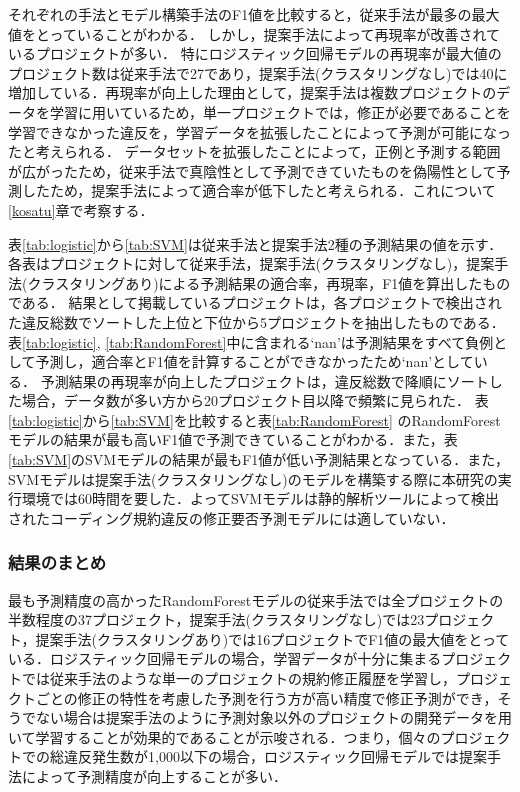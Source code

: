 \documentclass[submit,noauthor,dvipdfmx]{ipsj}
\begin{document}
それぞれの手法とモデル構築手法のF1値を比較すると，従来手法が最多の最大値をとっていることがわかる．
しかし，提案手法によって再現率が改善されているプロジェクトが多い．
特にロジスティック回帰モデルの再現率が最大値のプロジェクト数は従来手法で27であり，提案手法(クラスタリングなし)では40に増加している．再現率が向上した理由として，提案手法は複数プロジェクトのデータを学習に用いているため，単一プロジェクトでは，修正が必要であることを学習できなかった違反を，学習データを拡張したことによって予測が可能になったと考えられる．
データセットを拡張したことによって，正例と予測する範囲が広がったため，従来手法で真陰性として予測できていたものを偽陽性として予測したため，提案手法によって適合率が低下したと考えられる．これについて\ref{kosatu}章で考察する．

表\ref{tab:logistic}から\ref{tab:SVM}は従来手法と提案手法2種の予測結果の値を示す．
各表はプロジェクトに対して従来手法，提案手法(クラスタリングなし)，提案手法(クラスタリングあり)による予測結果の適合率，再現率，F1値を算出したものである．
結果として掲載しているプロジェクトは，各プロジェクトで検出された違反総数でソートした上位と下位から5プロジェクトを抽出したものである．
表\ref{tab:logistic}, \ref{tab:RandomForest}中に含まれる`nan'は予測結果をすべて負例として予測し，適合率とF1値を計算することができなかったため`nan'としている．
予測結果の再現率が向上したプロジェクトは，違反総数で降順にソートした場合，データ数が多い方から20プロジェクト目以降で頻繁に見られた．
表\ref{tab:logistic}から\ref{tab:SVM}を比較すると表\ref{tab:RandomForest} のRandomForestモデルの結果が最も高いF1値で予測できていることがわかる．また，表\ref{tab:SVM}のSVMモデルの結果が最もF1値が低い予測結果となっている．また，SVMモデルは提案手法(クラスタリングなし)のモデルを構築する際に本研究の実行環境では60時間を要した．よってSVMモデルは静的解析ツールによって検出されたコーディング規約違反の修正要否予測モデルには適していない．

\subsubsection{結果のまとめ}

最も予測精度の高かったRandomForestモデルの従来手法では全プロジェクトの半数程度の37プロジェクト，提案手法(クラスタリングなし)では23プロジェクト，提案手法(クラスタリングあり)では16プロジェクトでF1値の最大値をとっている．ロジスティック回帰モデルの場合，学習データが十分に集まるプロジェクトでは従来手法のような単一のプロジェクトの規約修正履歴を学習し，プロジェクトごとの修正の特性を考慮した予測を行う方が高い精度で修正予測ができ，そうでない場合は提案手法のように予測対象以外のプロジェクトの開発データを用いて学習することが効果的であることが示唆される．つまり，個々のプロジェクトでの総違反発生数が1,000以下の場合，ロジスティック回帰モデルでは提案手法によって予測精度が向上することが多い．
\end{document}
